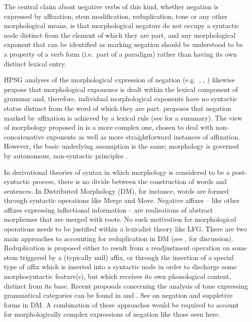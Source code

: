 \documentclass[output=paper,hidelinks]{langscibook}
\begin{document}
The central claim about negative verbs of this kind, whether negation is expressed by affixation, stem modification, reduplication, tone or any other morphological means, is that morphological negators do not occupy a syntactic node distinct from the element of which they are part, and any morphological exponent that can be identified as marking negation should be understood to be a property of a verb form (i.e.\ part of a paradigm) rather than having its own distinct lexical entry.

HPSG analyses of the morphological expression of negation (e.g.\ \citealt{Borsley:Krer:12}, \citealt{Kim:00}, \citealt{Kim:21}) likewise propose that morphological exponence is dealt within the lexical component of grammar and, therefore, individual morphological exponents have no syntactic status distinct from the word of which they are part. \citet {Kim:00} proposes that negation marked by affixation is achieved by a lexical rule (see \citealt{Kim:21} for a summary). The view of morphology proposed in \citet{Bond2016} is a more complex one, chosen to deal with non-concatenative exponents as well as more straightforward instances of affixation. However, the basic underlying assumption is the same; morphology is governed by autonomous, non-syntactic principles \citep{bresnan1995the-lexical}. 

In derivational theories of syntax in which morphology is considered to be a post-syntactic process, there is no divide between the construction of words and sentences. In Distributed Morphology (DM), for instance, words are formed through syntactic operations like Merge and Move. Negative affixes -- like other affixes expressing inflectional information -- are realisations of abstract morphemes that are merged with roots. No such motivation for morphological operations needs to be justified within a lexicalist theory like LFG. There are two main approaches to accounting for reduplication in DM (see \citealt{Frampton:09}, \citealt{Haugen:11} for discussion). Reduplication is proposed either to result from a readjustment operation on some stem triggered by a (typically null) affix, or through the insertion of a special type of affix which is inserted into a syntactic node in order to discharge some morphosyntactic feature(s), but which receives its own phonological content, distinct from its base. Recent proposals concerning the analysis of tone expressing grammatical categories can be found in \citet {Rolle:18} and \citet {Pak:19}. See \citet {Chung:07} on negation and suppletive forms in DM. A combination of these approaches would be required to account for morphologically complex expressions of negation like those seen here.
\end{document}
